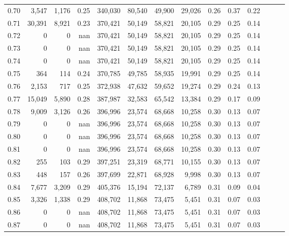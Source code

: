 \begin{tabular}{rrrrrrrrrrrrrr}
0.70 &   3,547 &  1,176 &  0.25 &  340,030 &   80,540 &  49,900 &  29,026 &  0.26 &  0.37 &      0.22 \\
0.71 &  30,391 &  8,921 &  0.23 &  370,421 &   50,149 &  58,821 &  20,105 &  0.29 &  0.25 &      0.14 \\
0.72 &       0 &      0 &   nan &  370,421 &   50,149 &  58,821 &  20,105 &  0.29 &  0.25 &      0.14 \\
0.73 &       0 &      0 &   nan &  370,421 &   50,149 &  58,821 &  20,105 &  0.29 &  0.25 &      0.14 \\
0.74 &       0 &      0 &   nan &  370,421 &   50,149 &  58,821 &  20,105 &  0.29 &  0.25 &      0.14 \\
0.75 &     364 &    114 &  0.24 &  370,785 &   49,785 &  58,935 &  19,991 &  0.29 &  0.25 &      0.14 \\
0.76 &   2,153 &    717 &  0.25 &  372,938 &   47,632 &  59,652 &  19,274 &  0.29 &  0.24 &      0.13 \\
0.77 &  15,049 &  5,890 &  0.28 &  387,987 &   32,583 &  65,542 &  13,384 &  0.29 &  0.17 &      0.09 \\
0.78 &   9,009 &  3,126 &  0.26 &  396,996 &   23,574 &  68,668 &  10,258 &  0.30 &  0.13 &      0.07 \\
0.79 &       0 &      0 &   nan &  396,996 &   23,574 &  68,668 &  10,258 &  0.30 &  0.13 &      0.07 \\
0.80 &       0 &      0 &   nan &  396,996 &   23,574 &  68,668 &  10,258 &  0.30 &  0.13 &      0.07 \\
0.81 &       0 &      0 &   nan &  396,996 &   23,574 &  68,668 &  10,258 &  0.30 &  0.13 &      0.07 \\
0.82 &     255 &    103 &  0.29 &  397,251 &   23,319 &  68,771 &  10,155 &  0.30 &  0.13 &      0.07 \\
0.83 &     448 &    157 &  0.26 &  397,699 &   22,871 &  68,928 &   9,998 &  0.30 &  0.13 &      0.07 \\
0.84 &   7,677 &  3,209 &  0.29 &  405,376 &   15,194 &  72,137 &   6,789 &  0.31 &  0.09 &      0.04 \\
0.85 &   3,326 &  1,338 &  0.29 &  408,702 &   11,868 &  73,475 &   5,451 &  0.31 &  0.07 &      0.03 \\
0.86 &       0 &      0 &   nan &  408,702 &   11,868 &  73,475 &   5,451 &  0.31 &  0.07 &      0.03 \\
0.87 &       0 &      0 &   nan &  408,702 &   11,868 &  73,475 &   5,451 &  0.31 &  0.07 &      0.03 \\

\end{tabular}
